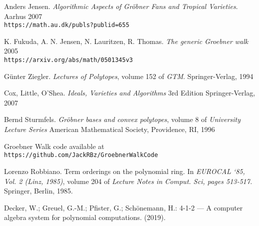  \begin{thebibliography}{4}
 Anders Jensen.
 \textit{Algorithmic Aspects of Gr\"{o}bner Fans and Tropical Varieties}.
 Aarhus 2007
 \\\texttt{https://math.au.dk/publs?publid=655}
 
 K. Fukuda, A. N. Jensen, N. Lauritzen, R. Thomas.
 \textit{The generic Groebner walk}
 2005
 \\\texttt{https://arxiv.org/abs/math/0501345v3}
 
 G\"{u}nter Ziegler.
 \textit{Lectures of Polytopes}, volume 152 of \textit{GTM}.
 Springer-Verlag, 1994
 
 
 Cox, Little, O'Shea.
 \textit{Ideals, Varieties and Algorithms} 3rd Edition
 Springer-Verlag, 2007
 
 Bernd Sturmfels.
 \textit{Gr\"{o}bner bases and convex polytopes}, volume 8 of \textit{University Lecture Series}
 American Mathematical Society, Providence, RI, 1996
 
 Groebner Walk code available at
 \\\texttt{https://github.com/JackRBz/GroebnerWalkCode}
 
 Lorenzo Robbiano.
 Term orderings on the polynomial ring. In \textit{EUROCAL `85, Vol. 2 (Linz, 1985)}, volume 204 of \textit{Lecture Notes in Comput. Sci, pages 513-517.}
 Springer, Berlin, 1985.
 
Decker, W.; Greuel, G.-M.; Pfister, G.; Sch{\"o}nemann, H.: 
 {4-1-2} --- {A} computer algebra system for polynomial computations.
 (2019).

 
 
 \end{thebibliography}